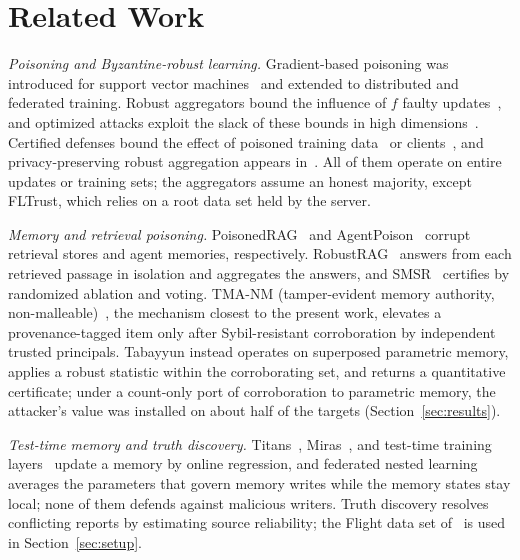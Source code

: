 \documentclass[journal]{IEEEtran}
\theoremstyle{remark}
\begin{document}
\section{Related Work}\label{sec:related}
\emph{Poisoning and Byzantine-robust learning.} Gradient-based poisoning was introduced for support vector machines~\cite{biggio2012poisoning} and extended to distributed and federated training. Robust aggregators bound the influence of $f$ faulty updates~\cite{yin2018byzantine,blanchard2017krum,pillutla2022rfa,karimireddy2021history,cao2021fltrust}, and optimized attacks exploit the slack of these bounds in high dimensions~\cite{fang2020local,baruch2019little,shejwalkar2021manipulating}. Certified defenses bound the effect of poisoned training data~\cite{steinhardt2017certified,jia2021bagging,levine2021dpa} or clients~\cite{cao2022flcert}, and privacy-preserving robust aggregation appears in~\cite{ma2022shieldfl,liu2021privacy}. All of them operate on entire updates or training sets; the aggregators assume an honest majority, except FLTrust, which relies on a root data set held by the server.

\emph{Memory and retrieval poisoning.} PoisonedRAG~\cite{zou2025poisonedrag} and AgentPoison~\cite{chen2024agentpoison} corrupt retrieval stores and agent memories, respectively. RobustRAG~\cite{xiang2024robustrag} answers from each retrieved passage in isolation and aggregates the answers, and SMSR~\cite{sharma2026smsr} certifies by randomized ablation and voting. \mbox{TMA-NM} (tamper-evident memory authority, non-malleable)~\cite{louck2026tma}, the mechanism closest to the present work, elevates a provenance-tagged item only after Sybil-resistant corroboration by independent trusted principals. Tabayyun instead operates on superposed parametric memory, applies a robust statistic within the corroborating set, and returns a quantitative certificate; under a count-only port of corroboration to parametric memory, the attacker's value was installed on about half of the targets (Section~\ref{sec:results}).

\emph{Test-time memory and truth discovery.} Titans~\cite{behrouz2024titans}, Miras~\cite{behrouz2025miras}, and test-time training layers~\cite{sun2024ttt} update a memory by online regression, and federated nested learning~\cite{chen2026fednl} averages the parameters that govern memory writes while the memory states stay local; none of them defends against malicious writers. Truth discovery resolves conflicting reports by estimating source reliability; the Flight data set of~\cite{li2012truth} is used in Section~\ref{sec:setup}.
\end{document}
